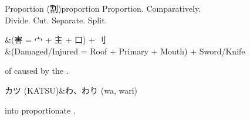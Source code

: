 \begin{glyph}{Proportion (割)}{proportion}\label{glyph:proportion}
Proportion.  Comparatively.\\\hline
Divide.  Cut.  Separate.  Split.
\end{glyph}

\begin{comps}
\comprtwocone&(害 = 宀 + 主 + 口) + 刂\\\hline
\comprthreecone&(Damaged/Injured = Roof + Primary + Mouth) + Sword/Knife\\\hline
{}
\end{comps}

\begin{remglyph}
 of  caused by the .\\\hline
\end{remglyph}

\begin{pronss}
カツ (KATSU)&わ、わり (wa, wari)\\\hline
\end{pronss}

\begin{remprons}
 into proportionate .\\\hline
\end{remprons}

